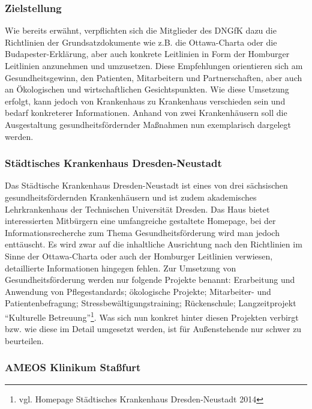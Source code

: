 \subsubsection{Zielstellung}
\label{sec:Zielstellung}

Wie bereits erwähnt, verpflichten sich die Mitglieder des DNGfK dazu die Richtlinien der Grundsatzdokumente wie z.B. die Ottawa-Charta oder die Budapester-Erklärung, aber auch konkrete Leitlinien in Form der Homburger Leitlinien anzunehmen und umzusetzen. Diese Empfehlungen orientieren sich am Gesundheitsgewinn, den  Patienten,  Mitarbeitern und Partnerschaften, aber auch an Ökologischen und wirtschaftlichen Gesichtspunkten. Wie diese Umsetzung erfolgt, kann jedoch von Krankenhaus zu Krankenhaus verschieden sein und bedarf konkreterer Informationen. Anhand von zwei Krankenhäusern soll die Ausgestaltung gesundheitsfördernder Maßnahmen nun exemplarisch dargelegt werden. 

\subsubsection{Städtisches Krankenhaus Dresden-Neustadt}
\label{sec:StädtischesKrankenhausDresdenNeustadt}

Das Städtische Krankenhaus Dresden-Neustadt ist eines von drei sächsischen gesundheitsfördernden Krankenhäusern und ist zudem akademisches Lehrkrankenhaus der Technischen Universität Dresden. Das Haus bietet interessierten Mitbürgern eine umfangreiche gestaltete Homepage, bei der Informationsrecherche zum Thema Gesundheitsförderung wird man jedoch enttäuscht. Es wird zwar auf die inhaltliche Ausrichtung nach den Richtlinien im Sinne der Ottawa-Charta oder auch der Homburger Leitlinien verwiesen, detaillierte Informationen hingegen fehlen. Zur Umsetzung von Gesundheitsförderung werden nur folgende Projekte benannt: Erarbeitung und Anwendung von Pflegestandards; ökologische Projekte; Mitarbeiter- und Patientenbefragung; Stressbewältigungstraining; Rückenschule; Langzeitprojekt "`Kulturelle Betreuung"'\footnote{vgl. Homepage Städtisches Krankenhaus Dresden-Neustadt 2014}. Was sich nun konkret hinter diesen Projekten verbirgt bzw. wie diese im Detail umgesetzt werden, ist für Außenstehende nur schwer zu beurteilen. 

\subsubsection{AMEOS Klinikum Staßfurt}
\label{sec:AMEOSKlinikumStassfurt}

